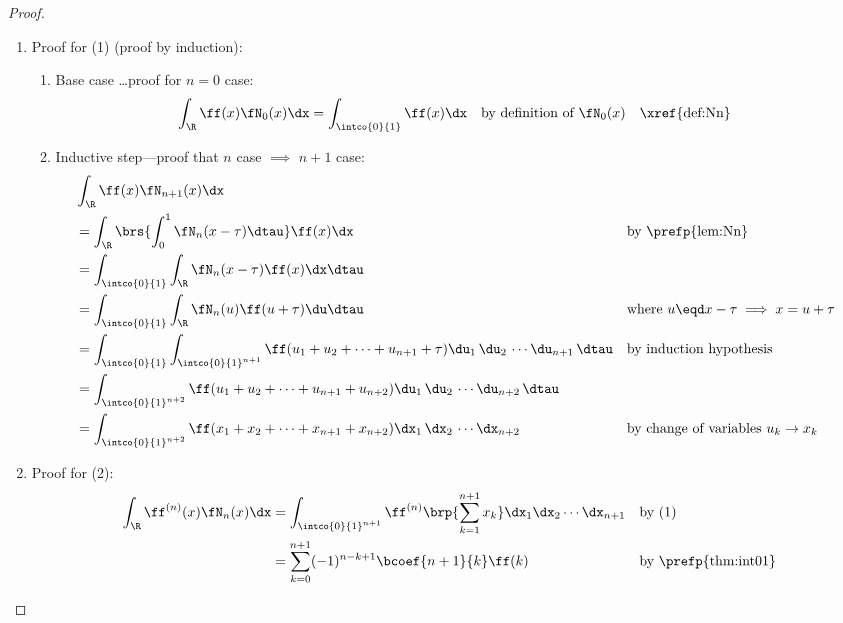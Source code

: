 \begin{proof}
\begin{enumerate}
\item Proof for (1) (proof by induction):
  \begin{enumerate}
    \item Base case \ldots proof for $n=0$ case:
      \begin{align*}
        \int_\R \ff(x)\fN_0(x)\dx
          &= \int_{\intco{0}{1}} \ff(x)\dx
          && \text{by definition of $\fN_0(x)$}
          && \text{\xref{def:Nn}}
      \end{align*}

    \item Inductive step---proof that $n$ case $\implies$ $n+1$ case:
      \begin{align*}
        &\int_\R \ff(x) \fN_{n+1}(x)\dx
        \\&= \int_\R \brs{\int_0^1\fN_n(x-\tau)\dtau} \ff(x)\dx
          && \text{by \prefp{lem:Nn}}
        \\&= \int_\intco{0}{1}\int_\R \fN_n(x-\tau) \ff(x) \dx \dtau
        \\&= \int_\intco{0}{1}\int_\R \fN_n(u) \ff(u+\tau) \du \dtau
          && \text{where $u\eqd x-\tau \implies x=u+\tau$}
        \\&= \int_\intco{0}{1}\int_{\intco{0}{1}^{n+1}} \ff(u_1+u_2+\cdots+u_{n+1}+\tau) \du_1\,\du_2\,\cdots\du_{n+1}\, \dtau
          && \text{by induction hypothesis}
        \\&= \int_{{\intco{0}{1}}^{n+2}} \ff(u_1+u_2+\cdots+u_{n+1}+u_{n+2}) \du_1\,\du_2\,\cdots\du_{n+2}\, \dtau
        \\&= \int_{\intco{0}{1}^{n+2}} \ff(x_1+x_2+\cdots+x_{n+1}+x_{n+2}) \dx_1\,\dx_2\,\cdots\dx_{n+2}
          && \text{by change of variables $u_k\rightarrow x_k$}
      \end{align*}
  \end{enumerate}

\item Proof for (2):
  \begin{align*}
    \int_\R \ff^{(n)}(x) \fN_n(x)\dx
      &= \int_{\intco{0}{1}^{n+1}} \ff^{(n)}\brp{\sum_{k=1}^{n+1} x_k} \dx_1\dx_2\cdots\dx_{n+1}
      && \text{by (1)}
    \\&= \sum_{k=0}^{n+1} (-1)^{n-k+1}\bcoef{n+1}{k}\ff(k)
      && \text{by \prefp{thm:int01}}
  \end{align*}

\end{enumerate}
\end{proof}


